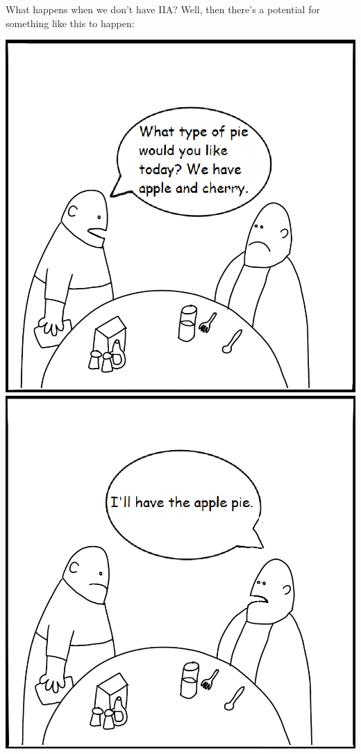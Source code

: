 \documentclass{article}
\begin{document}
\begin{itemize}
What happens when we don’t have IIA? Well, then there’s a potential for something like this to happen:
	\begin{center}
	    \includegraphics[width=\linewidth]{images/minions1.png}
	    \includegraphics[width=\linewidth]{images/minions2.png}

\end{center}
\end{itemize}
\end{document}

